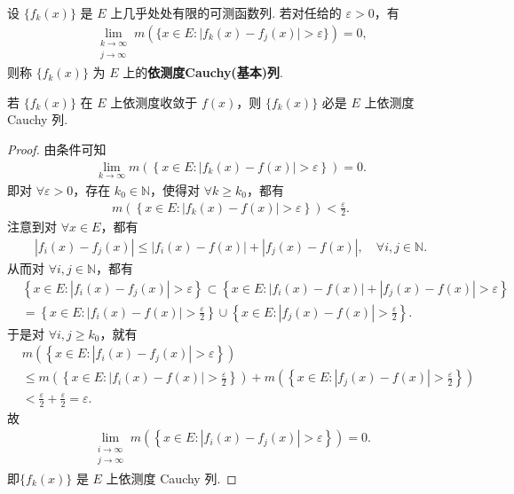 \documentclass[../../main.tex]{subfiles}%
\begin{document}
\begin{definition}[依测度Cauchy(基本)列]
设 $\{f_k(x)\}$ 是 $E$ 上几乎处处有限的可测函数列. 若对任给的 $\varepsilon>0$，有
\begin{align*}
\lim_{\substack{k\to\infty\\j\to\infty}}m(\{x\in E:\vert f_k(x)-f_j(x)\vert>\varepsilon\}) = 0,
\end{align*}
则称 $\{f_k(x)\}$ 为 $E$ 上的\textbf{依测度Cauchy(基本)列}.
\end{definition}

\begin{theorem}\label{theorem:依测度收敛必是依测度Cauchy列}
若 $\{f_k(x)\}$ 在 $E$ 上依测度收敛于 $f(x)$，则 $\{f_k(x)\}$ 必是 $E$ 上依测度 Cauchy 列.
\end{theorem}
\begin{proof}
由条件可知
\begin{align*}
\lim_{k\rightarrow\infty}m\left(\left\{x\in E:\left|f_k(x)-f(x)\right|>\varepsilon\right\}\right)=0.
\end{align*}
即对 $\forall\varepsilon > 0$，存在 $k_0\in\mathbb{N}$，使得对 $\forall k\geqslant k_0$，都有
\begin{align*}
m\left(\left\{x\in E:\left|f_k(x)-f(x)\right|>\varepsilon\right\}\right)<\frac{\varepsilon}{2}.
\end{align*}
注意到对 $\forall x\in E$，都有
\begin{align*}
\left|f_i(x)-f_j(x)\right|\leqslant\left|f_i(x)-f(x)\right|+\left|f_j(x)-f(x)\right|,\quad\forall i,j\in\mathbb{N}.
\end{align*}
从而对 $\forall i,j\in\mathbb{N}$，都有
\begin{align*}
&\left\{x\in E:\left|f_i(x)-f_j(x)\right|>\varepsilon\right\}\subset\left\{x\in E:\left|f_i(x)-f(x)\right|+\left|f_j(x)-f(x)\right|>\varepsilon\right\}\\
&=\left\{x\in E:\left|f_i(x)-f(x)\right|>\frac{\varepsilon}{2}\right\}\cup\left\{x\in E:\left|f_j(x)-f(x)\right|>\frac{\varepsilon}{2}\right\}.
\end{align*}
于是对 $\forall i,j\geqslant k_0$，就有
\begin{align*}
&m\left(\left\{x\in E:\left|f_i(x)-f_j(x)\right|>\varepsilon\right\}\right)\\
&\leqslant m\left(\left\{x\in E:\left|f_i(x)-f(x)\right|>\frac{\varepsilon}{2}\right\}\right)+m\left(\left\{x\in E:\left|f_j(x)-f(x)\right|>\frac{\varepsilon}{2}\right\}\right)\\
&<\frac{\varepsilon}{2}+\frac{\varepsilon}{2}=\varepsilon.
\end{align*}
故
\begin{align*}
\lim_{\substack{i\rightarrow\infty\\j\rightarrow\infty}}m\left(\left\{x\in E:\left|f_i(x)-f_j(x)\right|>\varepsilon\right\}\right)=0.
\end{align*}
即$\{f_k(x)\}$ 是 $E$ 上依测度 Cauchy 列.
\end{proof}
\end{document}
